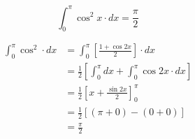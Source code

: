 \documentclass[14pt,fleqn]{extarticle}
\newcommand\intg{\int_0^\pi}
\begin{document}
 
\begin{snippet}
    \correct
    
    \[ \intg \cos^2 x \cdot dx = \frac\pi{2} \]
    
    \reason
    
    \begin{align}
	\intg \cos^2\cdot dx &= \intg \left[\frac{1+\cos 2x}{2} \right]\cdot dx \\
	&= \frac{1}{2} \left[\intg dx + \intg \cos 2x\cdot dx \right] \\
	&= \frac{1}{2} \left[x + \frac{\sin 2x}{2} \right]_0^\pi \\
	&= \frac{1}{2} \left[ \left(\pi + 0 \right) - \left(0 + 0 \right) \right] \\
	&= \frac\pi{2} 
\end{align}
    
\end{snippet} 
\end{document}
